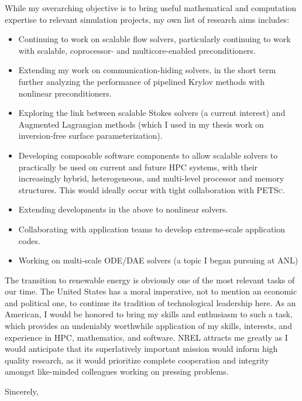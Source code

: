 \documentclass{letter}
\begin{document}
\begin{letter}{}
While my overarching objective is to bring useful mathematical and computation expertise to relevant simulation projects, my own list of research aims includes:
\begin{itemize}
\item Continuing to work on scalable flow solvers, particularly continuing to work with scalable, coprocessor- and multicore-enabled preconditioners.
  \item Extending my work on communication-hiding solvers, in the short term further analyzing the performance of pipelined Krylov methods with nonlinear preconditioners.
\item Exploring the link between scalable Stokes solvers (a current interest) and Augmented Lagrangian methods (which I used in my thesis work on inversion-free surface parameterization).
\item Developing composable software components to allow scalable solvers to practically be used on current and future HPC systems, with their increasingly hybrid, heterogeneous, and multi-level processor and memory structures. This would ideally occur with tight collaboration with \textsc{PETSc}.
\item Extending developments in the above to nonlinear solvers.
\item Collaborating with application teams to develop extreme-scale application codes.
\item Working on multi-scale ODE/DAE solvers (a topic I began pursuing at ANL)
\end{itemize}

 The transition to renewable energy is obviously one of the most relevant tasks of our time.
The United States has a moral imperative, not to mention an economic and political one, to continue its tradition of technological leadership here.
As an American, I would be honored to bring my skills and enthusiasm to such a task, which provides an undeniably worthwhile application of my skills, interests, and experience in HPC, mathematics, and software.
NREL attracts me greatly as I would anticipate that its superlatively important mission would inform high quality research, as it would prioritize complete cooperation and integrity amongst like-minded colleagues working on pressing problems.

\closing{Sincerely,}
\end{letter}
\end{document}
